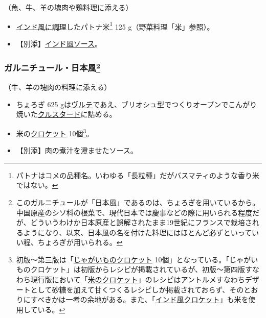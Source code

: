 \begin{recette}


（魚、牛、羊の塊肉や鶏料理に添える）

\begin{itemize}
\item
  \protect\hyperlink{riz-indienne}{インド風に調理}したパトナ米\footnote{パトナはコメの品種名。いわゆる「長粒種」だがバスマティのような香り米ではない。}
  125 g（野菜料理「\protect\hyperlink{riz}{米}」参照）。
\item
  【別添】\protect\hyperlink{sauce-indienne}{インド風ソース}。
\end{itemize}

\atoaki{}

\hypertarget{garniture-japonaise}{%
\subsubsection[ガルニチュール・日本風]{\texorpdfstring{ガルニチュール・日本風\footnote{このガルニチュールが「日本風」であるのは、ちょろぎを用いているから。中国原産のシソ科の根菜で、現代日本では慶事などの際に用いられる程度だが、どういうわけか日本原産と誤解されたまま19世紀にフランスで栽培されるようになり、以来、日本風の名を付けた料理にはほとんど必ずといっていい程、ちょろぎが用いられる。}}{ガルニチュール・日本風}}\label{garniture-japonaise}}



（牛、羊の塊肉の料理に添える）

\begin{itemize}
\item
  ちょろぎ 625
  gは\protect\hyperlink{veloute}{ヴルテ}であえ、ブリオシュ型でつくりオーブンでこんがり焼いた\protect\hyperlink{croustades}{クルスタード}に詰める。
\item
  米の\protect\hyperlink{croquettes}{クロケット} 10個\footnote{初版〜第三版は「\protect\hyperlink{croquettes-de-pommes-de-terre}{じゃがいものクロケット}
    10個」となっている。「じゃがいものクロケット」は初版からレシピが掲載されているが、初版〜第四版すなわち現行版において「\href{Ecroquettes-de-riz}{米のクロケット}」のレシピはアントルメすなわちデザートとして砂糖を加えて甘くつくるレシピしか掲載されておらず、そのとおりにすべきかは一考の余地がある。また、「\protect\hyperlink{croquettes-indienne}{インド風クロケット}」も米を使用している。}。
\item
  【別添】肉の煮汁を澄ませたソース。
\end{itemize}


\end{recette}
